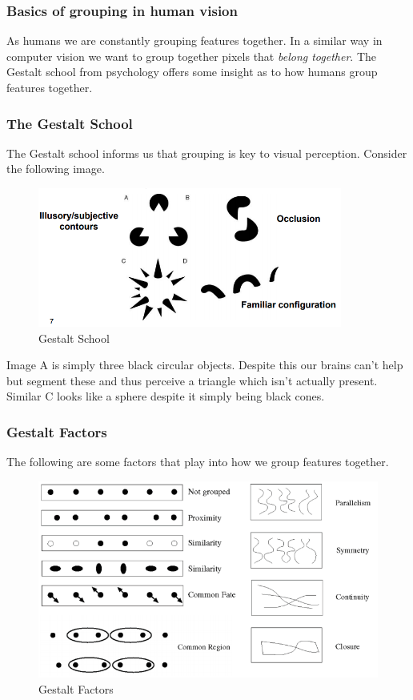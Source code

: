 \documentclass{article}
\begin{document}
\subsubsection{Basics of grouping in human vision}
As humans we are constantly grouping features together. In a similar way in computer vision we want to group together pixels that \textit{belong together}. The Gestalt school from psychology offers some insight as to how humans group features together.
\subsubsection{The Gestalt School}
The Gestalt school informs us that grouping is key to visual perception. Consider the following image.
\begin{figure}[htp]
    \centering
    \includegraphics[width=10cm]{slide_7_1}
    \caption{Gestalt School}
    \label{fig:Slide7_1}
\end{figure}

Image A is simply three black circular objects. Despite this our brains can't help but segment these and thus perceive a triangle which isn't actually present. Similar C looks like a sphere despite it simply being black cones.

\subsubsection{Gestalt Factors}
The following are some factors that play into how we group features together.
\begin{figure}[htp]
    \centering
    \includegraphics[width=12cm]{slide_8_1}
    \caption{Gestalt Factors}
    \label{fig:Slide8_1}
\end{figure}
\end{document}
